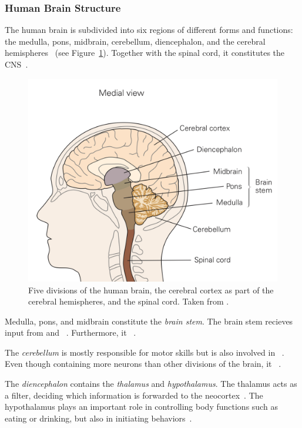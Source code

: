 \subsubsection{Human Brain Structure}

The human brain is subdivided into six regions of different forms and functions: the medulla, pons, midbrain, cerebellum, diencephalon, and the cerebral hemispheres~\citep[p. 340]{mack2013principles} (see Figure~\ref{fig:human_brain_divisions}).
Together with the spinal cord, it constitutes the \ac{CNS}~\citep[p. 340]{mack2013principles}.

\begin{figure}
    \centering
    \includegraphics[width=.4\textwidth]{images/brain_regions.jpeg}
    \caption[Divisions of the human brain]{Five divisions of the human brain, the cerebral cortex as part of the cerebral hemispheres, and the spinal cord. Taken from \citet[p. 340]{mack2013principles}.}
    \label{fig:human_brain_divisions}
\end{figure}

Medulla, pons, and midbrain constitute the \textit{brain stem}.
The brain stem recieves input from  and ~\citep[p. 341]{mack2013principles}.
Furthermore, it ~\citep[p. 341]{mack2013principles}.

The \textit{cerebellum} is mostly responsible for motor skills but is also involved in ~\citep[p. 341]{mack2013principles}.
Even though containing more neurons than other divisions of the brain, it ~\citep[p. 341]{mack2013principles}.

The \textit{diencephalon} contains the \textit{thalamus} and \textit{hypothalamus}.
The thalamus acts as a filter, deciding which information is forwarded to the neocortex~\citep[p. 341]{mack2013principles}.
The hypothalamus plays an important role in controlling body functions such as eating or drinking, but also in initiating behaviors~\citep[p. 341]{mack2013principles}.

